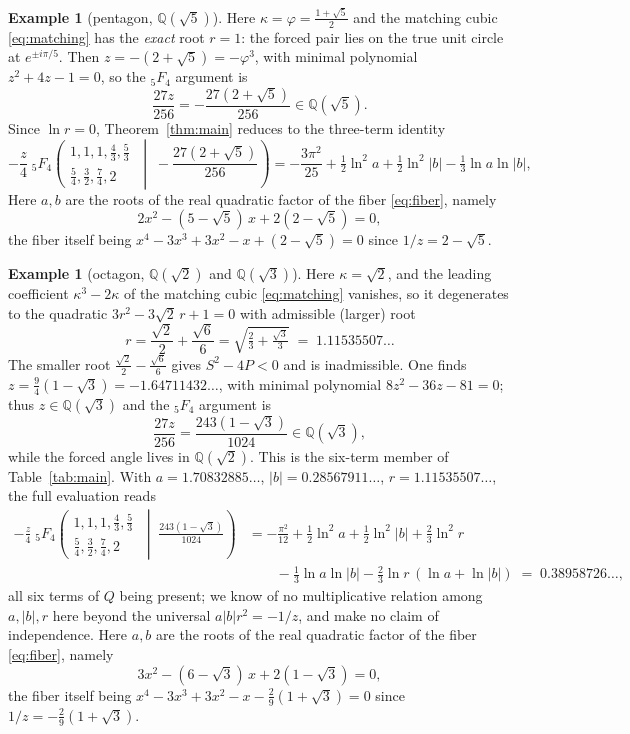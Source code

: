 \documentclass[11pt]{article}
\theoremstyle{definition}
\newtheorem{example}[theorem]{Example}
\newcommand{\Q}{\mathbb{Q}}
\begin{document}
\begin{example}[pentagon, $\Q(\sqrt5)$]
Here $\kappa=\varphi=\tfrac{1+\sqrt5}{2}$ and the matching cubic \eqref{eq:matching} has the
\emph{exact} root $r=1$: the forced pair lies on the true unit circle at $e^{\pm i\pi/5}$. Then
$z=-(2+\sqrt5)=-\varphi^3$, with minimal polynomial $z^2+4z-1=0$, so the ${}_5F_4$ argument is
\[
  \frac{27z}{256}=-\frac{27(2+\sqrt5)}{256}\in\Q(\sqrt5).
\]
Since $\ln r=0$, Theorem~\ref{thm:main} reduces to the three-term identity
\[
  -\frac{z}{4}\;{}_5F_4\!\left(\begin{matrix}1,1,1,\tfrac43,\tfrac53\\[2pt]
      \tfrac54,\tfrac32,\tfrac74,2\end{matrix}\;\middle|\;-\frac{27(2+\sqrt5)}{256}\right)
  = -\frac{3\pi^2}{25}+\tfrac12\ln^2 a+\tfrac12\ln^2|b|-\tfrac13\ln a\ln|b|,
\]
Here $a,b$ are the roots of the real quadratic factor of the fiber \eqref{eq:fiber}, namely
\[
  2x^2-(5-\sqrt5)\,x+2(2-\sqrt5)=0 ,
\]
the fiber itself being $x^4-3x^3+3x^2-x+(2-\sqrt5)=0$ since $1/z=2-\sqrt5$.
\end{example}

\begin{example}[octagon, $\Q(\sqrt2)$ and $\Q(\sqrt3)$]
Here $\kappa=\sqrt2$, and the leading coefficient $\kappa^3-2\kappa$ of the matching cubic
\eqref{eq:matching} vanishes, so it degenerates to the quadratic $3r^2-3\sqrt2\,r+1=0$ with admissible
(larger) root
\[
  r=\frac{\sqrt2}{2}+\frac{\sqrt6}{6}=\sqrt{\tfrac23+\tfrac{\sqrt3}{3}}\;=\;1.11535507\ldots
\]
The smaller root $\tfrac{\sqrt2}{2}-\tfrac{\sqrt6}{6}$ gives $S^2-4P<0$ and is inadmissible. One finds
$z=\tfrac94(1-\sqrt3)=-1.64711432\ldots$, with minimal polynomial $8z^2-36z-81=0$; thus
$z\in\Q(\sqrt3)$ and the ${}_5F_4$ argument is
\[
  \frac{27z}{256}=\frac{243(1-\sqrt3)}{1024}\in\Q(\sqrt3),
\]
while the forced angle lives in $\Q(\sqrt2)$. This is the six-term member of Table~\ref{tab:main}.
With $a=1.70832885\ldots$, $|b|=0.28567911\ldots$, $r=1.11535507\ldots$, the full evaluation reads
\begin{align*}
  -\frac{z}{4}\;{}_5F_4\!\left(\begin{matrix}1,1,1,\tfrac43,\tfrac53\\[2pt]
      \tfrac54,\tfrac32,\tfrac74,2\end{matrix}\;\middle|\;\frac{243(1-\sqrt3)}{1024}\right)
  &= -\frac{\pi^2}{12}
    + \tfrac12\ln^2 a+\tfrac12\ln^2|b|+\tfrac23\ln^2 r\\[2pt]
  &\qquad-\tfrac13\ln a\ln|b|-\tfrac23\ln r\,(\ln a+\ln|b|)
    \;=\;0.38958726\ldots,
\end{align*}
all six terms of $Q$ being present; we know of no multiplicative relation among $a,|b|,r$ here
beyond the universal $a|b|r^2=-1/z$, and make no claim of independence.
Here $a,b$ are the roots of the real quadratic factor of the fiber \eqref{eq:fiber}, namely
\[
  3x^2-(6-\sqrt3)\,x+2(1-\sqrt3)=0 ,
\]
the fiber itself being $x^4-3x^3+3x^2-x-\tfrac29(1+\sqrt3)=0$ since $1/z=-\tfrac29(1+\sqrt3)$.
\end{example}
\end{document}
